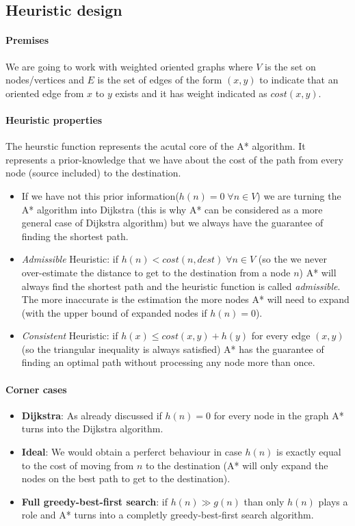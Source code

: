 \documentclass[twocolumn, switch]{article} %
\begin{document}
\subsection{Heuristic design}
\paragraph{Premises} We are going to work with weighted oriented graphs where $V$ is the set on nodes/vertices
and $E$ is the set of edges of the form $(x,y)$ to indicate that an oriented edge from $x$ to $y$ exists and it
has weight indicated as $cost(x, y)$.
\paragraph{Heuristic properties} 
The heurstic function represents the acutal core of the A* algorithm. It represents a prior-knowledge that
we have about the cost of the path from every node (source included) to the destination. 
\begin{itemize}
  \item If we have not this prior information($h(n) = 0 \;\forall n \in V$) we are turning the A* algorithm into
        Dijkstra (this is why A* can be considered as a more general case of Dijkstra algorithm) but we always
        have the guarantee of finding the shortest path. 
  \item \textit{Admissible} Heuristic: if $h(n) < cost(n, dest) \;\forall n \in V$ (so the we never over-estimate the distance to
        get to the destination from a node $n$) A* will always find the shortest path and the heuristic
        function is called \textit{admissible}. The more inaccurate
        is the estimation the more nodes A* will need to expand (with the upper bound of expanded nodes
        if $h(n) = 0$).
  \item \textit{Consistent} Heuristic: if $h(x) \le cost(x, y) + h(y)$ for every edge $(x, y)$ (so the triangular
        inequality is always satisfied) A* has the guarantee of finding an optimal path without processing
        any node more than once. 
\end{itemize}
\paragraph{Corner cases} 
\begin{itemize}
  \item \textbf{Dijkstra}: As already discussed if $h(n)=0$ for every node in the graph A* turns into the Dijkstra algorithm.
  \item \textbf{Ideal}: We would obtain a perferct behaviour in case $h(n)$ is exactly equal to the cost of moving from $n$ to
  the destination (A* will only expand the nodes on the best path to get to the destination).
  \item \textbf{Full greedy-best-first search}: if $h(n) \gg g(n)$ than only $h(n)$ plays a role and A* turns into
        a completly greedy-best-first search algorithm.
\end{itemize}
\end{document}
